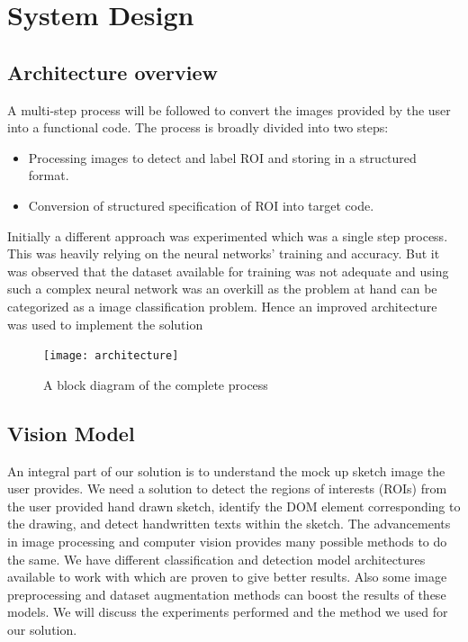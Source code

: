 
\chapter{System Design}

  \section{Architecture overview}
  A multi-step process will be followed to convert the images provided by the user into a functional code. The process is broadly divided into two steps:
  \begin{itemize}
		\item Processing images to detect and label ROI and storing in  a structured format.
    \item Conversion of structured specification of ROI into target code.
	\end{itemize}
  Initially a different approach was experimented which was a single step process. This was heavily relying on the neural networks’ training and accuracy. But it was observed that the dataset available for training was not adequate and using such a complex neural network was an overkill as the problem at hand can be categorized as a image classification problem. Hence an improved architecture was used to implement the solution
  \begin{figure}
		\centering
		\texttt{[image: architecture]}
		\caption
		{A block diagram of the complete process}
	\end{figure}

  \section{Vision Model}
    An integral part of our solution is to understand the mock up sketch image the user provides. We need a solution to detect the regions of interests (ROIs) from the user provided hand drawn sketch, identify the DOM element corresponding to the drawing, and detect handwritten texts within the sketch. The advancements in image processing and computer vision provides many possible methods to do the same. We have different classification and detection model architectures available to work with which are proven to give better results. Also some image preprocessing and dataset augmentation methods can boost the results of these models. We will discuss the experiments performed and the method we used for our solution.

